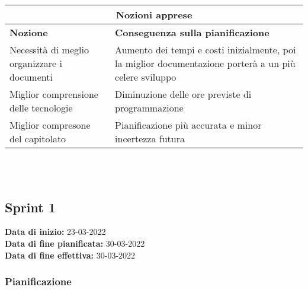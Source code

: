 \documentclass[a4paper, 12pt]{article}
\begin{document}
\begin{center}
    \begin{tabularx}{\textwidth}{|X|X|}
        \hline
        \multicolumn{2}{|c|}{\textbf{Nozioni apprese}}\\
        \hline
        \hline
        \textbf{Nozione} & \textbf{Conseguenza sulla pianificazione}\\
        \hline
        Necessità di meglio organizzare i documenti & Aumento dei tempi e costi inizialmente, poi la miglior documentazione porterà a un più celere sviluppo\\
        \hline
        Miglior comprensione delle tecnologie & Diminuzione delle ore previste di programmazione\\
        \hline
        Miglior compresone del capitolato & Pianificazione più accurata e minor incertezza futura\\
        \hline
    \end{tabularx}\\[8pt]
    \mbox{}\\
\end{center}

\subsection{Sprint 1}
\textbf{Data di inizio:} 23-03-2022\\
\textbf{Data di fine pianificata:} 30-03-2022\\
\textbf{Data di fine effettiva:} 30-03-2022

\subsubsection{Pianificazione}\mbox{}
\end{document}

